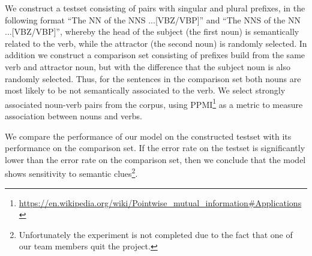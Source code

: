 We construct a testset consisting of pairs with singular and plural prefixes, in the following format  
``The NN of the NNS ...[VBZ/VBP]'' and
``The NNS of the NN ...[VBZ/VBP]'', 
whereby the head of the subject (the first noun)
is semantically related to the verb, while the attractor (the second noun)
is randomly selected. 
In addition we construct a comparison set consisting of prefixes
build from the same verb and attractor noun,
but with the difference that the subject noun is also randomly selected.
Thus, for the sentences in the comparison set both nouns
are most likely to be not semantically associated to the verb.
We select strongly associated noun-verb pairs from the corpus,
using PPMI\footnote{
\url{https://en.wikipedia.org/wiki/Pointwise_mutual_information\#Applications}
} as a metric to measure association between nouns and verbs. 

We compare the performance of our model on
the constructed testset with its performance
on the comparison set.
If the error rate on the testset is significantly
lower than the error rate on the comparison set,
then we conclude that the model shows sensitivity to semantic clues\footnote{Unfortunately the experiment is not completed
due to the fact that one of our team members quit the project.}.









